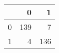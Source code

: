 \begin{tabular}{lrr}
\toprule
{} &    0 &    1 \\
\midrule
0 &  139 &    7 \\
1 &    4 &  136 \\
\bottomrule
\end{tabular}
